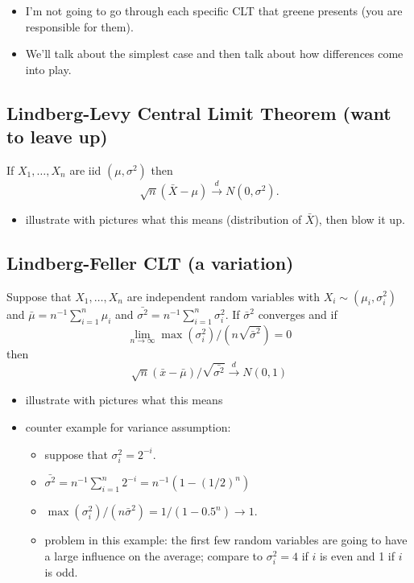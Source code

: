 \begin{itemize}
\item I'm not going to go through each specific CLT that greene
       presents (you are responsible for them).
\item We'll talk about the simplest case and then talk about how
       differences come into play.
\end{itemize}
\subsection{Lindberg-Levy Central Limit Theorem (want to leave up)}
\label{sec-3-2}

     If $X_1,\dots,X_n$ are iid $(\mu, \sigma^2)$ then 
     \[\sqrt{n} (\bar X - \mu) \xrightarrow{d} N(0,\sigma^2).\]

\begin{itemize}
\item illustrate with pictures what this means (distribution of $\bar
       X$), then blow it up.
\end{itemize}
\subsection{Lindberg-Feller CLT (a variation)}
\label{sec-3-3}

     Suppose that $X_1,\dots,X_n$ are independent random variables with
     $X_i \sim (\mu_i, \sigma_i^2)$ and $\bar \mu = n^{-1}\sum_{i=1}^n
     \mu_i$ and $\bar{\sigma^2} = n^{-1} \sum_{i=1}^n \sigma_i^2$.  If
     $\bar{\sigma}^2$ converges and if
     \[\lim_{n\to\infty} \max(\sigma_i^2)/(n\sqrt{\bar{\sigma}^2}) = 0\]
     then $$\sqrt{n}(\bar x - \bar \mu)/\sqrt{\bar{\sigma^2}} \xrightarrow{d} N(0,1)$$
\begin{itemize}
\item illustrate with pictures what this means
\item counter example for variance assumption:
\begin{itemize}
\item suppose that $\sigma_i^2 = 2^{-i}$.
\item $\bar{\sigma^2} = n^{-1} \sum_{i=1}^n 2^{-i} = n^{-1}(1 - (1/2)^n)$
\item $\max(\sigma_i^2)/(n\bar{\sigma}^2) = 1/(1-0.5^n) \to 1$.
\item problem in this example: the first few random variables are
         going to have a large influence on the average; compare to
         $\sigma_i^2 = 4$ if $i$ is even and 1 if $i$ is odd.
\end{itemize}
\end{itemize}
